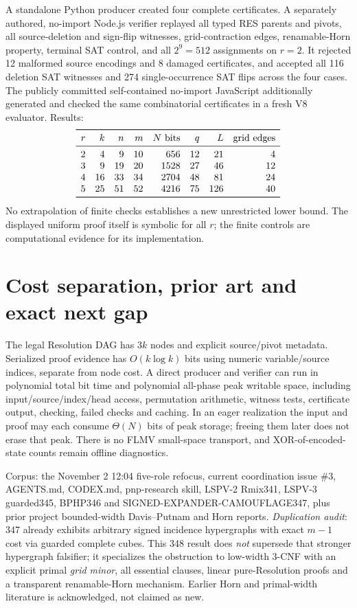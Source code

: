 \documentclass[11pt]{article}
\begin{document}
A standalone Python producer created four complete certificates. A separately authored, no-import Node.js verifier replayed all typed RES parents and pivots, all source-deletion and sign-flip witnesses, grid-contraction edges, renamable-Horn property, terminal SAT control, and all $2^9=512$ assignments on $r=2$. It rejected 12 malformed source encodings and 8 damaged certificates, and accepted all 116 deletion SAT witnesses and 274 single-occurrence SAT flips across the four cases. The publicly committed self-contained no-import JavaScript additionally generated and checked the same combinatorial certificates in a fresh V8 evaluator. Results:
\[
\begin{array}{rrrrrrrr}
\toprule
r&k&n&m&N\text{ bits}&q&L&\text{grid edges}\\
\midrule
2&4&9&10&656&12&21&4\\
3&9&19&20&1528&27&46&12\\
4&16&33&34&2704&48&81&24\\
5&25&51&52&4216&75&126&40\\
\bottomrule
\end{array}
\]
No extrapolation of finite checks establishes a new unrestricted lower bound. The displayed uniform proof itself is symbolic for all $r$; the finite controls are computational evidence for its implementation.

\section*{Cost separation, prior art and exact next gap}
The legal Resolution DAG has $3k$ nodes and explicit source/pivot metadata. Serialized proof evidence has $O(k\log k)$ bits using numeric variable/source indices, separate from node cost. A direct producer and verifier can run in polynomial total bit time and polynomial all-phase peak writable space, including input/source/index/head access, permutation arithmetic, witness tests, certificate output, checking, failed checks and caching. In an eager realization the input and proof may each consume $\Theta(N)$ bits of peak storage; freeing them later does not erase that peak. There is no FLMV small-space transport, and XOR-of-encoded-state counts remain offline diagnostics.

Corpus: the November 2 12:04 five-role refocus, current coordination issue \#3, AGENTS.md, CODEX.md, pnp-research skill, LSPV-2 Rmix341, LSPV-3 guarded345, BPHP346 and SIGNED-EXPANDER-CAMOUFLAGE347, plus prior project bounded-width Davis--Putnam and Horn reports. \emph{Duplication audit}: 347 already exhibits arbitrary signed incidence hypergraphs with exact $m-1$ cost via guarded complete cubes. This 348 result does \emph{not} supersede that stronger hypergraph falsifier; it specializes the obstruction to low-width 3-CNF with an explicit primal \emph{grid minor}, all essential clauses, linear pure-Resolution proofs and a transparent renamable-Horn mechanism. Earlier Horn and primal-width literature is acknowledged, not claimed as new.
\end{document}
